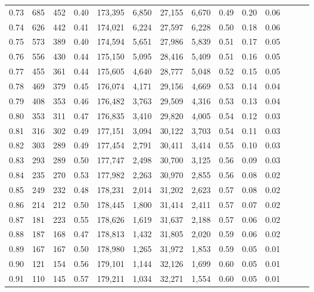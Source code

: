 \begin{tabular}{rrrrrrrrrrrrrr}
0.73 &    685 &  452 &  0.40 &  173,395 &    6,850 &  27,155 &   6,670 &  0.49 &  0.20 &      0.06 \\
0.74 &    626 &  442 &  0.41 &  174,021 &    6,224 &  27,597 &   6,228 &  0.50 &  0.18 &      0.06 \\
0.75 &    573 &  389 &  0.40 &  174,594 &    5,651 &  27,986 &   5,839 &  0.51 &  0.17 &      0.05 \\
0.76 &    556 &  430 &  0.44 &  175,150 &    5,095 &  28,416 &   5,409 &  0.51 &  0.16 &      0.05 \\
0.77 &    455 &  361 &  0.44 &  175,605 &    4,640 &  28,777 &   5,048 &  0.52 &  0.15 &      0.05 \\
0.78 &    469 &  379 &  0.45 &  176,074 &    4,171 &  29,156 &   4,669 &  0.53 &  0.14 &      0.04 \\
0.79 &    408 &  353 &  0.46 &  176,482 &    3,763 &  29,509 &   4,316 &  0.53 &  0.13 &      0.04 \\
0.80 &    353 &  311 &  0.47 &  176,835 &    3,410 &  29,820 &   4,005 &  0.54 &  0.12 &      0.03 \\
0.81 &    316 &  302 &  0.49 &  177,151 &    3,094 &  30,122 &   3,703 &  0.54 &  0.11 &      0.03 \\
0.82 &    303 &  289 &  0.49 &  177,454 &    2,791 &  30,411 &   3,414 &  0.55 &  0.10 &      0.03 \\
0.83 &    293 &  289 &  0.50 &  177,747 &    2,498 &  30,700 &   3,125 &  0.56 &  0.09 &      0.03 \\
0.84 &    235 &  270 &  0.53 &  177,982 &    2,263 &  30,970 &   2,855 &  0.56 &  0.08 &      0.02 \\
0.85 &    249 &  232 &  0.48 &  178,231 &    2,014 &  31,202 &   2,623 &  0.57 &  0.08 &      0.02 \\
0.86 &    214 &  212 &  0.50 &  178,445 &    1,800 &  31,414 &   2,411 &  0.57 &  0.07 &      0.02 \\
0.87 &    181 &  223 &  0.55 &  178,626 &    1,619 &  31,637 &   2,188 &  0.57 &  0.06 &      0.02 \\
0.88 &    187 &  168 &  0.47 &  178,813 &    1,432 &  31,805 &   2,020 &  0.59 &  0.06 &      0.02 \\
0.89 &    167 &  167 &  0.50 &  178,980 &    1,265 &  31,972 &   1,853 &  0.59 &  0.05 &      0.01 \\
0.90 &    121 &  154 &  0.56 &  179,101 &    1,144 &  32,126 &   1,699 &  0.60 &  0.05 &      0.01 \\
0.91 &    110 &  145 &  0.57 &  179,211 &    1,034 &  32,271 &   1,554 &  0.60 &  0.05 &      0.01 \\

\end{tabular}
